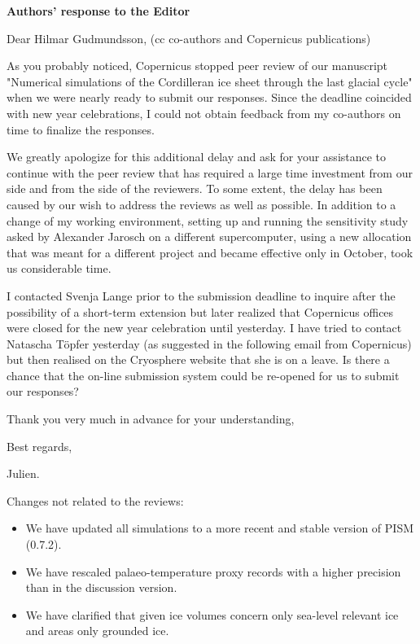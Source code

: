 


\textbf{Authors' response to the Editor}
\bigskip

Dear Hilmar Gudmundsson,
(cc co-authors and Copernicus publications)

As you probably noticed, Copernicus stopped peer review of our manuscript
"Numerical simulations of the Cordilleran ice sheet through the last glacial
cycle" when we were nearly ready to submit our responses. Since the deadline
coincided with new year celebrations, I could not obtain feedback from my
co-authors on time to finalize the responses.

We greatly apologize for this additional delay and ask for your assistance to
continue with the peer review that has required a large time investment from
our side and from the side of the reviewers. To some extent, the delay has been
caused by our wish to address the reviews as well as possible. In addition to a
change of my working environment, setting up and running the sensitivity study
asked by Alexander Jarosch on a different supercomputer, using a new allocation
that was meant for a different project and became effective only in October,
took us considerable time.

I contacted Svenja Lange prior to the submission deadline to inquire after the
possibility of a short-term extension but later realized that Copernicus
offices were closed for the new year celebration until yesterday. I have tried
to contact Natascha T\"{o}pfer yesterday (as suggested in the following email from
Copernicus) but then realised on the Cryosphere website that she is on a leave.
Is there a chance that the on-line submission system could be re-opened for us
to submit our responses?

Thank you very much in advance for your understanding,

Best regards,

Julien.

\bigskip

Changes not related to the reviews:

\begin{itemize}

    \item We have updated all simulations to a more recent and stable version
    of PISM (0.7.2).

    \item We have rescaled palaeo-temperature proxy records with a higher
    precision than in the discussion version.

    \item We have clarified that given ice volumes concern only sea-level
    relevant ice and areas only grounded ice.

\end{itemize}

